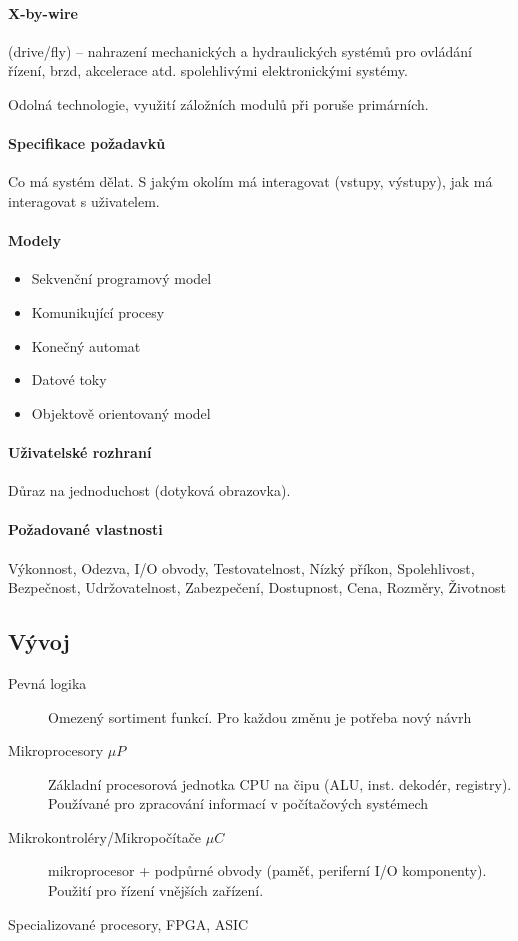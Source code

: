 \documentclass[a4paper, 11pt]{report}
\begin{document}
\paragraph{X-by-wire} (drive/fly) -- nahrazení mechanických a hydraulických systémů pro ovládání řízení, brzd, akcelerace atd. spolehlivými elektronickými systémy.

Odolná technologie, využití záložních modulů při poruše primárních.

\paragraph{Specifikace požadavků}
Co má systém dělat. S jakým okolím má interagovat (vstupy, výstupy), jak má interagovat s uživatelem.

\paragraph{Modely}
\begin{itemize}
	\item Sekvenční programový model
	\item Komunikující procesy
	\item Konečný automat
	\item Datové toky
	\item Objektově orientovaný model
\end{itemize}

\paragraph{Uživatelské rozhraní}
Důraz na jednoduchost (dotyková obrazovka).

\paragraph{Požadované vlastnosti}
Výkonnost,  Odezva,  I/O obvody,  Testovatelnost,  Nízký příkon,  Spolehlivost,  Bezpečnost,  Udržovatelnost,  Zabezpečení,  Dostupnost,  Cena,  Rozměry,  Životnost

\subsection{Vývoj}
\begin{description}
	\item[Pevná logika] Omezený sortiment funkcí. Pro každou změnu je potřeba nový návrh
	\item[Mikroprocesory $\mu P$] Základní procesorová jednotka CPU na čipu (ALU, inst. dekodér, registry). Používané pro zpracování informací v počítačových systémech
	\item[Mikrokontroléry/Mikropočítače $\mu C$] mikroprocesor + podpůrné obvody (paměť, periferní I/O komponenty). Použití pro řízení vnějších zařízení.
	\item[Specializované procesory, FPGA, ASIC] 
\end{description}
\end{document}
